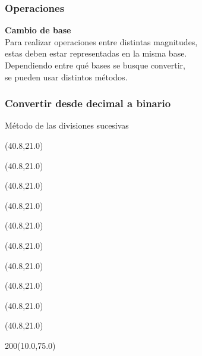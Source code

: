 \documentclass[aspectratio=169]{beamer}
\begin{document}
\begin{frame}[fragile]
    \frametitle{Operaciones}
    \large \textbf{Cambio de base}\\
    \bigskip
    \normalsize
    Para realizar operaciones entre distintas magnitudes,\\ estas deben estar representadas en la misma base.\\
    Dependiendo entre qué bases se busque convertir,\\ se pueden usar distintos métodos.
\end{frame}

\begin{frame}[fragile,t]
    \frametitle{Convertir desde decimal a binario}
    Método de las divisiones sucesivas
    \begin{textblock}{20}(40.8,21.0)  \end{textblock}
    \begin{textblock}{20}(40.8,21.0)  \end{textblock}
    \begin{textblock}{20}(40.8,21.0)  \end{textblock}
    \begin{textblock}{20}(40.8,21.0)  \end{textblock}
    \begin{textblock}{20}(40.8,21.0)  \end{textblock}
    \begin{textblock}{20}(40.8,21.0)  \end{textblock}
    \begin{textblock}{20}(40.8,21.0)  \end{textblock}
    \begin{textblock}{20}(40.8,21.0)  \end{textblock}
    \begin{textblock}{20}(40.8,21.0)  \end{textblock}
    \begin{textblock}{20}(40.8,21.0)  \end{textblock}
    \begin{textblock}{200}(10.0,75.0)  \end{textblock}
\end{frame}
\end{document}
